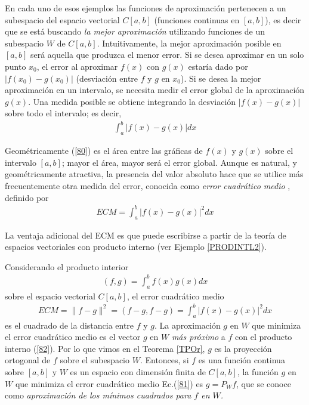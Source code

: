 \bigskip

En cada uno de esos ejemplos las funciones de aproximación pertenecen a un subespacio del espacio vectorial $C[a,b]$  (funciones continuas en $[a,b]$), es decir que se está buscando \textit{la mejor aproximación}  utilizando funciones de un subespacio  $W$ de $C[a,b]$. Intuitivamente, la mejor aproximación posible en $[a,b]$ será aquella que produzca el menor error. Si se desea aproximar en un solo punto $x_0$, el error al aproximar $f(x)$ con $g(x)$ estaría dado por $ \left| f(x_0)-g(x_0)   \right|$ (desviación entre $f$ y $g$ en $x_0$). Si se desea la mejor aproximación en un intervalo, se necesita medir el error global de la aproximación $g(x)$. Una medida posible se obtiene integrando la desviación $\left| f(x)-g(x)   \right|$ sobre todo el intervalo; es decir,
\begin{eqnarray}
 \int_a^b {\left| f(x)-g(x)   \right|dx}
 \label{80}
 \end{eqnarray}
 
 Geométricamente (\ref{80}) es el área entre las gráficas de $f(x)$ y $g(x)$ sobre el intervalo $[a,b]$; mayor el área, mayor será el error global.
 Aunque es natural, y geométricamente atractiva, la presencia del valor absoluto hace que se utilice más frecuentemente otra medida del error, conocida como \textit{error cuadrático medio }, definido por 
 \begin{eqnarray}
 ECM=\int_a^b {\left| f(x)-g(x)   \right|^2dx}
 \label{81}
 \end{eqnarray}
 
 La ventaja adicional del ECM es que puede escribirse a partir de la teoría de espacios vectoriales con producto interno (ver Ejemplo \ref{PRODINTL2}). 
 
 Considerando el producto interior 
 \begin{eqnarray}
 (f,g)=\int_a^b {f(x)g(x)dx}
 \label{82}
 \end{eqnarray}
 sobre el espacio vectorial $C[a,b]$, el error cuadrático medio
 \begin{eqnarray}
 ECM=\|f-g\|^2=(f-g,f-g)=\int_a^b{\left| f(x)-g(x)   \right|^2dx}
 \label{83}
 \end{eqnarray}
 es el cuadrado de la distancia entre $f$ y $g$. La aproximación  $g$ en $W$ que minimiza el error cuadrático medio es el vector $g$ en $W$ \textit{más próximo}  a $f$ con el producto interno (\ref{82}). Por lo que vimos en el Teorema \ref{TPOr},  $g$ es la proyección ortogonal de $f$ sobre el subespacio $W$. Entonces, si $f$ es una función continua sobre $[a,b]$ y $W$ es un espacio con dimensión finita de $C[a,b]$, la función $g$ en $W$ que minimiza el error cuadrático medio Ec.(\ref{81}) es $g=P_W f$, que se conoce como \textit{aproximación de los mínimos cuadrados para $f$ en $W$.}
 
